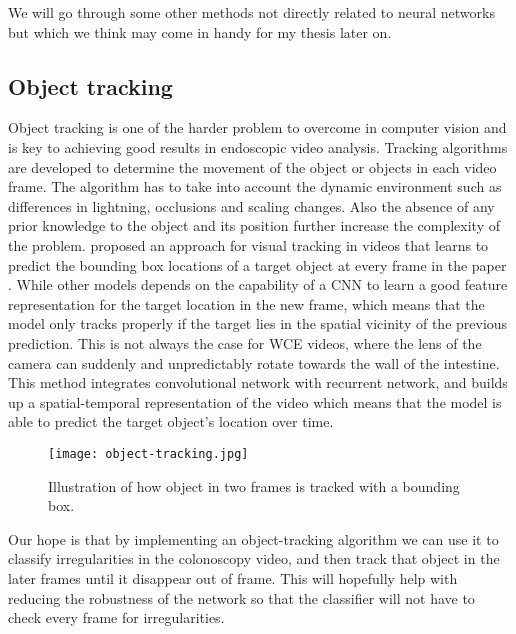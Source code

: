 \documentclass[thesis.tex]{subfiles}
\begin{document}
\medbreak
We will go through some other methods not directly related to neural networks but which we think may come in handy for my thesis later on. 


\subsection{Object tracking}
Object tracking is one of the harder problem to overcome in computer vision and is key to achieving good results in endoscopic video analysis. Tracking algorithms are developed to determine the movement of the object or objects in each video frame. The algorithm has to take into account the dynamic environment such as differences in lightning, occlusions and scaling changes. Also the absence of any prior knowledge to the object and its position further increase the complexity of the problem. \citeauthor*{DeepReinforcement17} proposed an approach for visual tracking in videos that learns to predict the bounding box locations of a target object at every frame in the paper  \cite{DeepReinforcement17}. While other models depends on the capability of a CNN to learn a good feature representation for the target location in the new frame, which means that the model only tracks properly if the target lies in the spatial vicinity of the previous prediction. This is not always the case for WCE videos, where the lens of the camera can suddenly and unpredictably rotate towards the wall of the intestine. This method integrates convolutional network with recurrent network, and builds up a spatial-temporal representation of the video which means that the model is able to predict the target object's location over time.

\begin{figure}[H] %
  \begin{center}
    \texttt{[image: object-tracking.jpg]}
    \caption[Illustration of how object in two frames is tracked with a bounding box]{Illustration of how object in two frames is tracked with a bounding box\footnotemark. }
    \label{fig:object-tracking}
  \end{center}
\end{figure}


Our hope is that by implementing an object-tracking algorithm we can use it to classify irregularities in the colonoscopy video, and then track that object in the later frames until it disappear out of frame. This will hopefully help with reducing the robustness of the network so that the classifier will not have to check every frame for irregularities. 
\end{document}
